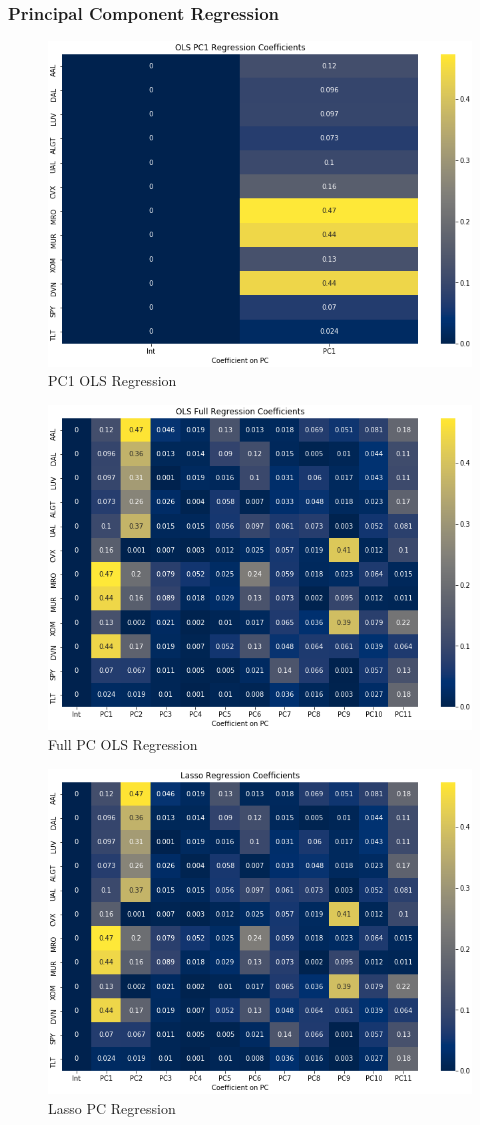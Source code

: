 \documentclass{article}
\begin{document}
\subsubsection{Principal Component Regression}
\begin{figure}[h!]
  \centering
    \includegraphics[width=.4\linewidth]{../Figures/PC1_PCReg_coef.png}
    \caption{PC1 OLS Regression}
\end{figure}
\begin{figure}[h!]
    \centering
    \includegraphics[width=.4\linewidth]{../Figures/Full_PCReg_coef.png}
    \caption{Full PC OLS Regression}
\end{figure}
\begin{figure}[h!]
    \centering
    \includegraphics[width=.4\linewidth]{../Figures/Lasso_PCReg_coef.png}
    \caption{Lasso PC Regression}
\end{figure}

\newpage
\end{document}

